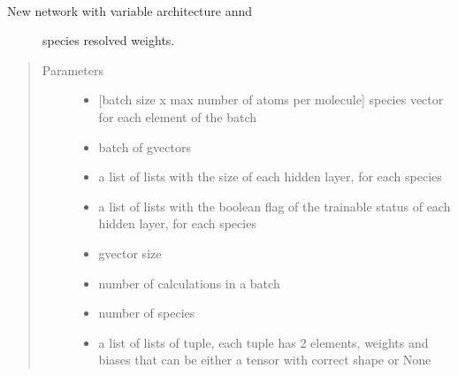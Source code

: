 \documentclass[letterpaper,10pt,english]{sphinxmanual}
\begin{document}
\begin{fulllineitems}
\label{\detokenize{neuralnet/networks:networks.network_A2A}}~\begin{description}
\item[{New network with variable architecture annd}] \leavevmode
species resolved weights.

\end{description}
\begin{quote}\begin{description}
\item[{Parameters}] \leavevmode\begin{itemize}
\item {} 
 \textendash{} {[}batch size x max number of atoms per molecule{]}
species vector for each element of the batch

\item {} 
 \textendash{} batch of gvectors

\item {} 
 \textendash{} a list of lists with the size of each
hidden layer, for each species

\item {} 
 \textendash{} a list of lists with the boolean flag
of the trainable status of each
hidden layer, for each species

\item {} 
 \textendash{} gvector size

\item {} 
 \textendash{} number of calculations in a batch

\item {} 
 \textendash{} number of species

\item {} 
 \textendash{} a list of lists of tuple,
each tuple has 2 elements,
weights and biases
that can be either a tensor with
correct shape or None


\end{itemize}
\end{description}
\end{quote}
\end{fulllineitems}
\end{document}
